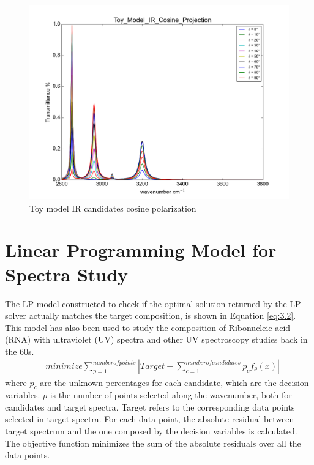 \begin{figure}[!ht] \label{fig:3.1}
\centering
\includegraphics[scale=0.4]{Figures/Toy_Model_IR_Cosine_Projection.png} 
\caption{Toy model IR candidates cosine polarization} 
\end{figure}


\section{Linear Programming Model for Spectra Study}

The LP model constructed to check if the optimal solution returned by the LP solver actually matches the target composition, is shown in Equation \ref{eq:3.2}. This model has also been used to study the composition of Ribonucleic acid (RNA) with ultraviolet (UV) spectra \cite{NYAS:NYAS900} and other UV spectroscopy studies  \cite{LPATUAS} back in the 60s. \\

\begin{eqnarray} \label{eq:3.2}
& minimize \displaystyle\sum^{number of points}_{p=1} \left| Target- \displaystyle\sum^{number of candidates}_{c=1}p_{c}f_{\theta}(x) \right| 
\end{eqnarray}
where $p_{c}$ are the unknown percentages for each candidate, which are the decision variables. $p$ is the number of points selected along the wavenumber, both for candidates and target spectra. Target refers to the corresponding data points selected in target spectra. For each data point, the absolute residual between target spectrum and the one composed by the decision variables is calculated. The objective function minimizes the sum of the absolute residuals over all the data points. \\

